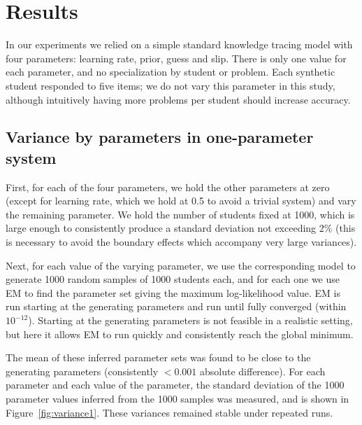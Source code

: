 \documentclass{edm_template}
\begin{document}
\section{Results}

In our experiments we relied on a simple standard knowledge tracing model with four parameters: learning rate, prior, guess and slip. There is only one value for each parameter, and no specialization by student or problem. Each synthetic student responded to five items; we do not vary this parameter in this study, although
intuitively having more problems per student should increase accuracy.

\subsection{Variance by parameters in one-parameter system}
\label{variance1}

First, for each of the four parameters, we hold the other parameters at zero (except for learning rate, which we hold at 0.5 to avoid a trivial system) and vary the remaining parameter. We hold the number of students fixed at 1000, which is large enough to consistently produce a standard deviation not exceeding 2\% (this is necessary to avoid the boundary effects which accompany very large variances).

Next, for each value of the varying parameter, we use the corresponding model to generate 1000 random samples of 1000 students each, and for each one we use EM to find the parameter set giving the maximum log-likelihood value. EM is run starting at the generating parameters and run until fully converged (within $10^{-12}$). Starting at the generating parameters is not feasible in a realistic setting, but here it allows EM to run quickly and consistently reach the global minimum.

The mean of these inferred parameter sets was found to be close to the generating parameters (consistently $< 0.001$ absolute difference). For each parameter and each value of the parameter, the standard deviation of the 1000 parameter values inferred from the 1000 samples was measured, and is shown in Figure~\ref{fig:variance1}. These variances remained stable under repeated runs.
\end{document}
